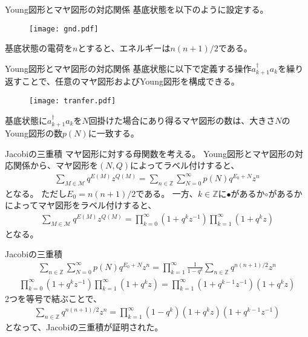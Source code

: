 \documentclass[\main/TL_liquid.tex]{subfiles}
\begin{document}
\begin{frame}{Young図形とマヤ図形の対応関係}
    基底状態を以下のように設定する。
    \begin{figure}[H]
        \centering
        \texttt{[image: gnd.pdf]}
    \end{figure}
    基底状態の電荷を$n$とすると、エネルギーは$n(n+1)/2$である。
\end{frame}

\begin{frame}{Young図形とマヤ図形の対応関係}
    基底状態に以下で定義する操作$a_{k+1}^\dagger a_k$を繰り返すことで、任意のマヤ図形およびYoung図形を構成できる。
    \begin{figure}[H]
        \centering
        \texttt{[image: tranfer.pdf]}
    \end{figure}
    基底状態に$a_{k+1}^\dagger a_k$を$N$回掛けた場合にあり得るマヤ図形の数は、大きさ$N$のYoung図形の数$p(N)$に一致する。
\end{frame}

\begin{frame}{Jacobiの三重積}
    マヤ図形に対する母関数を考える。
    Young図形とマヤ図形の対応関係から、マヤ図形を$(N,Q)$によってラベル付けすると、
    \begin{align}
        \sum_{M \in \mathcal{M}} q^{E(M)}z^{Q(M)}
        =
        \sum_{n\in\mathbb{Z}} \sum_{N=0}^\infty p(N)q^{E_0+N} z^{n}
    \end{align}
    となる。
    ただし$E_0 = n(n+1)/2$である。
    一方、$k\in \mathbb{Z}$に$\bullet$があるか$\circ$があるかによってマヤ図形をラベル付けすると、
    \begin{align}
        \sum_{M \in \mathcal{M}} q^{E(M)}z^{Q(M)}
        =
        \prod_{k = 0}^\infty (1+q^{k} z^{-1}) \prod_{k=1}^\infty (1+q^k z)
    \end{align}
    となる。
\end{frame}

\begin{frame}{Jacobiの三重積}
    \begin{align}
        \sum_{n\in\mathbb{Z}} \sum_{N=0}^\infty p(N)q^{E_0+N} z^{n}
        = \prod_{k=1}^\infty \frac{1}{1-q^k} \sum_{n \in \mathbb{Z}} q^{n(n+1)/2}z^n
    \end{align}
    \begin{align}
        \prod_{k = 0}^\infty (1+q^k z^{-1}) \prod_{k=1}^\infty (1+q^k z)
        = \prod_{k=1}^\infty (1+q^{k-1}z^{-1})(1+q^kz)
    \end{align}
    2つを等号で結ぶことで、
    \begin{align}
        \sum_{n\in \mathbb{Z}} q^{n(n+1)/2}z^n
        = \prod_{k=1}^{\infty}
            (1-q^{k})(1+q^{k}z)(1+q^{k-1}z^{-1})
        \label{Jacobi triple product}
    \end{align}
    となって、Jacobiの三重積が証明された。
\end{frame}

\end{document}
